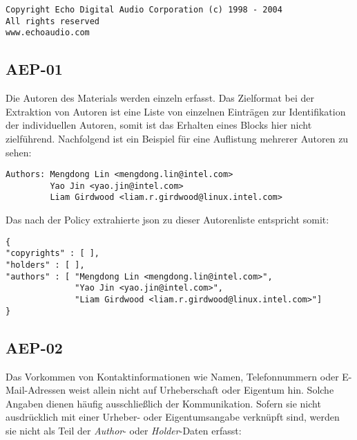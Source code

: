 \begin{lstlisting}[keepspaces=true]
Copyright Echo Digital Audio Corporation (c) 1998 - 2004
All rights reserved
www.echoaudio.com
\end{lstlisting}


\subsection{AEP-01}\label{subsec:aep-01}

Die Autoren des Materials werden einzeln erfasst.
Das Zielformat bei der Extraktion von Autoren ist eine Liste von einzelnen Einträgen zur Identifikation der individuellen Autoren, somit ist das Erhalten eines Blocks hier nicht zielführend.
Nachfolgend ist ein Beispiel für eine Auflistung mehrerer Autoren zu sehen:

\begin{lstlisting}[keepspaces=true]
Authors: Mengdong Lin <mengdong.lin@intel.com>
         Yao Jin <yao.jin@intel.com>
         Liam Girdwood <liam.r.girdwood@linux.intel.com>
\end{lstlisting}

Das nach der Policy extrahierte \gls{json} zu dieser Autorenliste entspricht somit:

\begin{lstlisting}[keepspaces=true]
{
"copyrights" : [ ],
"holders" : [ ],
"authors" : [ "Mengdong Lin <mengdong.lin@intel.com>",
              "Yao Jin <yao.jin@intel.com>",
              "Liam Girdwood <liam.r.girdwood@linux.intel.com>"]
}
\end{lstlisting}


\subsection{AEP-02}\label{subsec:aep-02}

Das Vorkommen von Kontaktinformationen wie Namen, Telefonnummern oder E-Mail-Adressen weist allein nicht auf Urheberschaft oder Eigentum hin.
Solche Angaben dienen häufig ausschließlich der Kommunikation.
Sofern sie nicht ausdrücklich mit einer Urheber- oder Eigentumsangabe verknüpft sind, werden sie nicht als Teil der \textit{Author}- oder \textit{Holder}-Daten erfasst:

